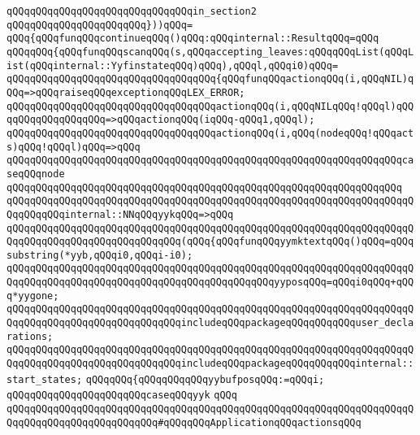 \verb|qQQqqQQqqQQqqQQqqQQqqQQqqQQqqQQqin_section2|\newline
\verb|qQQqqQQqqQQqqQQqqQQqqQQq}))qQQq=|\newline
\verb|qQQq{qQQqfunqQQqcontinueqQQq()qQQq:qQQqinternal::ResultqQQq=qQQq|\newline
\verb|qQQqqQQq{qQQqfunqQQqscanqQQq(s,qQQqaccepting_leaves:qQQqqQQqList(qQQqList(qQQqinternal::YyfinstateqQQq)qQQq),qQQql,qQQqi0)qQQq=|\newline
\verb|qQQqqQQqqQQqqQQqqQQqqQQqqQQqqQQqqQQq{qQQqfunqQQqactionqQQq(i,qQQqNIL)qQQq=>qQQqraiseqQQqexceptionqQQqLEX_ERROR;|\newline
\verb|qQQqqQQqqQQqqQQqqQQqqQQqqQQqqQQqqQQqactionqQQq(i,qQQqNILqQQq!qQQql)qQQqqQQqqQQqqQQqqQQq=>qQQqactionqQQq(iqQQq-qQQq1,qQQql);|\newline
\verb|qQQqqQQqqQQqqQQqqQQqqQQqqQQqqQQqqQQqactionqQQq(i,qQQq(nodeqQQq!qQQqacts)qQQq!qQQql)qQQq=>qQQq|\newline
\verb|qQQqqQQqqQQqqQQqqQQqqQQqqQQqqQQqqQQqqQQqqQQqqQQqqQQqqQQqqQQqqQQqqQQqcaseqQQqnode|\newline
\verb|qQQqqQQqqQQqqQQqqQQqqQQqqQQqqQQqqQQqqQQqqQQqqQQqqQQqqQQqqQQqqQQqqQQq|\newline
\verb|qQQqqQQqqQQqqQQqqQQqqQQqqQQqqQQqqQQqqQQqqQQqqQQqqQQqqQQqqQQqqQQqqQQqqQQqqQQqqQQqinternal::NNqQQqyykqQQq=>qQQq|\newline
\verb|qQQqqQQqqQQqqQQqqQQqqQQqqQQqqQQqqQQqqQQqqQQqqQQqqQQqqQQqqQQqqQQqqQQqqQQqqQQqqQQqqQQqqQQqqQQqqQQqqQQq(qQQq{qQQqfunqQQqyymktextqQQq()qQQq=qQQqsubstring(*yyb,qQQqi0,qQQqi-i0);|\newline
\verb|qQQqqQQqqQQqqQQqqQQqqQQqqQQqqQQqqQQqqQQqqQQqqQQqqQQqqQQqqQQqqQQqqQQqqQQqqQQqqQQqqQQqqQQqqQQqqQQqqQQqqQQqqQQqqQQqqQQqyyposqQQq=qQQqi0qQQq+qQQq*yygone;|\newline
\verb|qQQqqQQqqQQqqQQqqQQqqQQqqQQqqQQqqQQqqQQqqQQqqQQqqQQqqQQqqQQqqQQqqQQqqQQqqQQqqQQqqQQqqQQqqQQqqQQqqQQqincludeqQQqpackageqQQqqQQqqQQquser_declarations;|\newline
\verb|qQQqqQQqqQQqqQQqqQQqqQQqqQQqqQQqqQQqqQQqqQQqqQQqqQQqqQQqqQQqqQQqqQQqqQQqqQQqqQQqqQQqqQQqqQQqqQQqqQQqincludeqQQqpackageqQQqqQQqqQQqinternal::start_states;|\newline
\verb|qQQqqQQq{qQQqqQQqqQQqyybufposqQQq:=qQQqi;|\newline
\verb|qQQqqQQqqQQqqQQqqQQqqQQqcaseqQQqyyk|\newline
\verb|qQQq|\newline
\newline
\verb|qQQqqQQqqQQqqQQqqQQqqQQqqQQqqQQqqQQqqQQqqQQqqQQqqQQqqQQqqQQqqQQqqQQqqQQqqQQqqQQqqQQqqQQqqQQqqQQq#qQQqqQQqApplicationqQQqactionsqQQq|\newline
